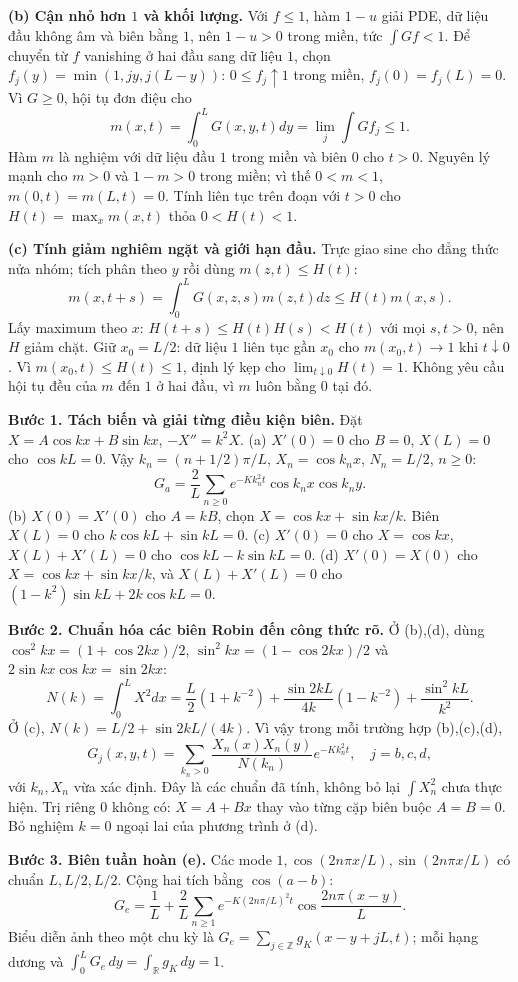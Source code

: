 \textbf{(b) Cận nhỏ hơn $1$ và khối lượng.}
Với $f\le1$, hàm $1-u$ giải PDE, dữ liệu đầu không âm và biên bằng $1$, nên $1-u>0$ trong miền, tức $\int Gf<1$. Để chuyển từ $f$ vanishing ở hai đầu sang dữ liệu $1$, chọn $f_j(y)=\min(1,jy,j(L-y))$: $0\le f_j\uparrow1$ trong miền, $f_j(0)=f_j(L)=0$. Vì $G\ge0$, hội tụ đơn điệu cho
\[m(x,t)=\int_0^LG(x,y,t)dy=\lim_j\int Gf_j\le1.\]
Hàm $m$ là nghiệm với dữ liệu đầu $1$ trong miền và biên $0$ cho $t>0$. Nguyên lý mạnh cho $m>0$ và $1-m>0$ trong miền; vì thế $0<m<1$, $m(0,t)=m(L,t)=0$. Tính liên tục trên đoạn với $t>0$ cho $H(t)=\max_xm(x,t)$ thỏa $0<H(t)<1$.

\textbf{(c) Tính giảm nghiêm ngặt và giới hạn đầu.}
Trực giao sine cho đẳng thức nửa nhóm; tích phân theo $y$ rồi dùng $m(z,t)\le H(t)$:
\[m(x,t+s)=\int_0^LG(x,z,s)m(z,t)dz\le H(t)m(x,s).\]
Lấy maximum theo $x$: $H(t+s)\le H(t)H(s)<H(t)$ với mọi $s,t>0$, nên $H$ giảm chặt. Giữ $x_0=L/2$: dữ liệu $1$ liên tục gần $x_0$ cho $m(x_0,t)\to1$ khi $t\downarrow0$. Vì $m(x_0,t)\le H(t)\le1$, định lý kẹp cho $\lim_{t\downarrow0}H(t)=1$. Không yêu cầu hội tụ đều của $m$ đến $1$ ở hai đầu, vì $m$ luôn bằng $0$ tại đó.

\textbf{Bước 1. Tách biến và giải từng điều kiện biên.}
Đặt $X=A\cos kx+B\sin kx$, $-X''=k^2X$.
(a) $X'(0)=0$ cho $B=0$, $X(L)=0$ cho $\cos kL=0$. Vậy $k_n=(n+1/2)\pi/L$, $X_n=\cos k_nx$, $N_n=L/2$, $n\ge0$:
\[G_a=\frac2L\sum_{n\ge0}e^{-Kk_n^2t}\cos k_nx\cos k_ny.\]
(b) $X(0)=X'(0)$ cho $A=kB$, chọn $X=\cos kx+\sin kx/k$. Biên $X(L)=0$ cho $k\cos kL+\sin kL=0$.
(c) $X'(0)=0$ cho $X=\cos kx$, $X(L)+X'(L)=0$ cho $\cos kL-k\sin kL=0$.
(d) $X'(0)=X(0)$ cho $X=\cos kx+\sin kx/k$, và $X(L)+X'(L)=0$ cho $(1-k^2)\sin kL+2k\cos kL=0$.

\textbf{Bước 2. Chuẩn hóa các biên Robin đến công thức rõ.}
Ở (b),(d), dùng $\cos^2kx=(1+\cos2kx)/2$, $\sin^2kx=(1-\cos2kx)/2$ và $2\sin kx\cos kx=\sin2kx$:
\[N(k)=\int_0^LX^2dx
=\frac L2(1+k^{-2})+\frac{\sin2kL}{4k}(1-k^{-2})+\frac{\sin^2kL}{k^2}.\]
Ở (c), $N(k)=L/2+\sin2kL/(4k)$. Vì vậy trong mỗi trường hợp (b),(c),(d),
\[G_j(x,y,t)=\sum_{k_n>0}\frac{X_n(x)X_n(y)}{N(k_n)}e^{-Kk_n^2t},\quad j=b,c,d,\]
với $k_n,X_n$ vừa xác định. Đây là các chuẩn đã tính, không bỏ lại $\int X_n^2$ chưa thực hiện. Trị riêng $0$ không có: $X=A+Bx$ thay vào từng cặp biên buộc $A=B=0$. Bỏ nghiệm $k=0$ ngoại lai của phương trình ở (d).

\textbf{Bước 3. Biên tuần hoàn (e).}
Các mode $1,\cos(2n\pi x/L),\sin(2n\pi x/L)$ có chuẩn $L,L/2,L/2$. Cộng hai tích bằng $\cos(a-b)$:
\[G_e=\frac1L+\frac2L\sum_{n\ge1}e^{-K(2n\pi/L)^2t}\cos\frac{2n\pi(x-y)}L.\]
Biểu diễn ảnh theo một chu kỳ là $G_e=\sum_{j\in\mathbb Z}g_K(x-y+jL,t)$; mỗi hạng dương và $\int_0^LG_e\,dy=\int_{\mathbb R}g_K\,dy=1$.

